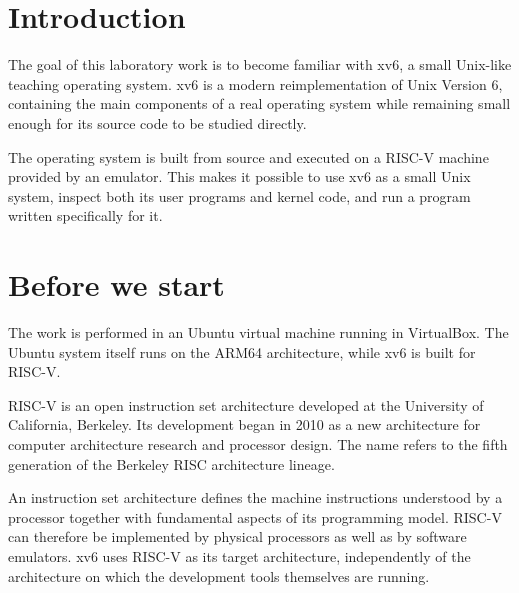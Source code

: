 \documentclass{tum_report}
\begin{document}
    
    \clearpage

    \tableofcontents
    \thispagestyle{empty}
    \clearpage



\chapter{Introduction}

The goal of this laboratory work is to become familiar with xv6, a small
Unix-like teaching operating system. xv6 is a modern reimplementation of
Unix Version 6, containing the main components of a real operating system
while remaining small enough for its source code to be studied directly.

The operating system is built from source and executed on a RISC-V machine
provided by an emulator. This makes it possible to use xv6 as a small Unix
system, inspect both its user programs and kernel code, and run a program
written specifically for it.


\clearpage

\chapter{Before we start}

The work is performed in an Ubuntu virtual machine running in VirtualBox.
The Ubuntu system itself runs on the ARM64 architecture, while xv6 is built
for RISC-V.

RISC-V is an open instruction set architecture developed at the University
of California, Berkeley. Its development began in 2010 as a new architecture
for computer architecture research and processor design. The name refers to
the fifth generation of the Berkeley RISC architecture lineage.

An instruction set architecture defines the machine instructions understood
by a processor together with fundamental aspects of its programming model.
RISC-V can therefore be implemented by physical processors as well as by
software emulators. xv6 uses RISC-V as its target architecture, independently
of the architecture on which the development tools themselves are running.
\end{document}
